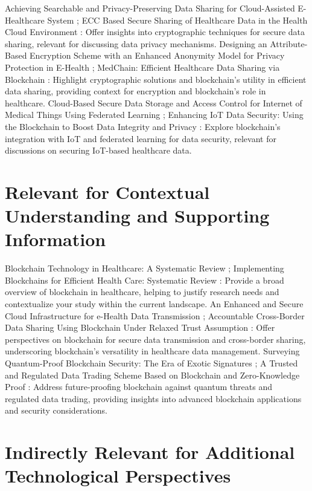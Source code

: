 \documentclass[cic,tc,english]{iiufrgs}
\begin{document}
    Achieving Searchable and Privacy-Preserving Data Sharing for Cloud-Assisted E-Healthcare System \cite{XuChang2019}; ECC Based Secure Sharing of Healthcare Data in the Health Cloud Environment \cite{sri2019}: Offer insights into cryptographic techniques for secure data sharing, relevant for discussing data privacy mechanisms.
    Designing an Attribute-Based Encryption Scheme with an Enhanced Anonymity Model for Privacy Protection in E-Health \cite{Zala2024}; MedChain: Efficient Healthcare Data Sharing via Blockchain \cite{Shen2019}: Highlight cryptographic solutions and blockchain’s utility in efficient data sharing, providing context for encryption and blockchain's role in healthcare.
    Cloud-Based Secure Data Storage and Access Control for Internet of Medical Things Using Federated Learning \cite{Bhansali2022}; Enhancing IoT Data Security: Using the Blockchain to Boost Data Integrity and Privacy \cite{Eghmazi2024}: Explore blockchain's integration with IoT and federated learning for data security, relevant for discussions on securing IoT-based healthcare data.

\section{Relevant for Contextual Understanding and Supporting Information}

    Blockchain Technology in Healthcare: A Systematic Review \cite{Saeed2022}; Implementing Blockchains for Efficient Health Care: Systematic Review \cite{Vazirani2019}: Provide a broad overview of blockchain in healthcare, helping to justify research needs and contextualize your study within the current landscape.
    An Enhanced and Secure Cloud Infrastructure for e-Health Data Transmission \cite{Memos2021}; Accountable Cross-Border Data Sharing Using Blockchain Under Relaxed Trust Assumption \cite{Rahman2020}: Offer perspectives on blockchain for secure data transmission and cross-border sharing, underscoring blockchain's versatility in healthcare data management.
    Surveying Quantum-Proof Blockchain Security: The Era of Exotic Signatures \cite{Naz2024}; A Trusted and Regulated Data Trading Scheme Based on Blockchain and Zero-Knowledge Proof \cite{Li2024}: Address future-proofing blockchain against quantum threats and regulated data trading, providing insights into advanced blockchain applications and security considerations.

\section{Indirectly Relevant for Additional Technological Perspectives}
\end{document}
